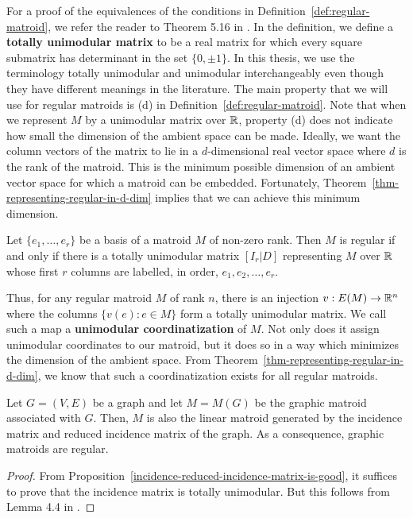 \documentclass{puthesis-UG}
\begin{document}
For a proof of the equivalences of the conditions in Definition~\ref{def:regular-matroid}, we refer the reader to Theorem 5.16 in \cite{10.5555/1197093}. In the definition, we define a \textbf{totally unimodular matrix} to be a real matrix for which every square submatrix has determinant in the set $\{0, \pm 1\}$. In this thesis, we use the terminology totally unimodular and unimodular interchangeably even though they have different meanings in the literature. The main property that we will use for regular matroids is (d) in Definition~\ref{def:regular-matroid}. Note that when we represent $M$ by a unimodular matrix over $\mathbb{R}$, property (d) does not indicate how small the dimension of the ambient space can be made. Ideally, we want the column vectors of the matrix to lie in a $d$-dimensional real vector space where $d$ is the rank of the matroid. This is the minimum possible dimension of an ambient vector space for which a matroid can be embedded. Fortunately, Theorem~\ref{thm-representing-regular-in-d-dim} implies that we can achieve this minimum dimension.

\begin{thm} \label{thm-representing-regular-in-d-dim}
	Let $\{e_1, \ldots, e_r\}$ be a basis of a matroid $M$ of non-zero rank. Then $M$ is regular if and only if there is a totally unimodular matrix $[I_r | D]$ representing $M$ over $\mathbb{R}$ whose first $r$ columns are labelled, in order, $e_1, e_2, \ldots, e_r$. 
\end{thm}

Thus, for any regular matroid $M$ of rank $n$, there is an injection $v : E(M) \to \mathbb{R}^n$ where the columns $\{v(e) : e \in M\}$ form a totally unimodular matrix. We call such a map a \textbf{unimodular coordinatization} of $M$. Not only does it assign unimodular coordinates to our matroid, but it does so in a way which minimizes the dimension of the ambient space. From Theorem~\ref{thm-representing-regular-in-d-dim}, we know that such a coordinatization exists for all regular matroids. 

\begin{prop} \label{graphic-matroid-is-regular-prop}
	Let $G = (V, E)$ be a graph and let $M = M(G)$ be the graphic matroid associated with $G$. Then, $M$ is also the linear matroid generated by the incidence matrix and reduced incidence matrix of the graph. As a consequence, graphic matroids are regular.
\end{prop}

\begin{proof}
	From Proposition~\ref{incidence-reduced-incidence-matrix-is-good}, it suffices to prove that the incidence matrix is totally unimodular. But this follows from Lemma 4.4 in \cite{fujishige}. 
\end{proof}
\end{document}
